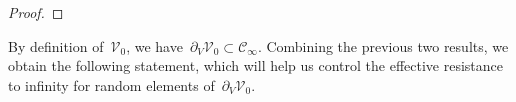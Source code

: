 \documentclass[a4paper,11pt]{article}
\newcommand{\cm}[1]{{\color{blue} #1}}
\theoremstyle{definition}
\begin{document}
\begin{proof}
\end{proof}
By definition of~$\mathcal V_0$, we have~$\partial_V\mathcal V_0 \subset \mathcal C_\infty$. Combining the previous two results, we obtain the following statement, which will help us control the effective resistance to infinity for random elements of~$ \partial_V \mathcal V_0$.
\end{document}
